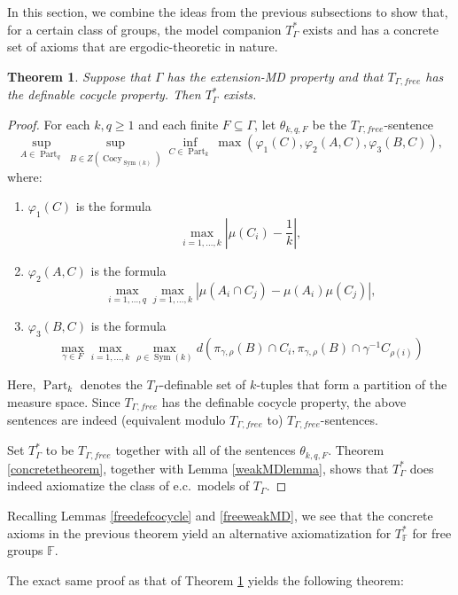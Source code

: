\documentclass[12pt]{amsart}
\newtheorem{thm}{Theorem}[section]
\theoremstyle{definition}
\def\bb{\mathbb}
\def\bb{\mathbb}
\def\Cocy{\operatorname{Cocy}}
\begin{document}
In this section, we combine the ideas from the previous subsections to show that, for a certain class of groups, the model companion $T_\Gamma^*$ exists and has a concrete set of axioms that are ergodic-theoretic in nature. 

\begin{thm}\label{mainaxioms1}
Suppose that $\Gamma$ has the extension-MD property and that $T_{\Gamma,free}$ has the definable cocycle property.  Then $T_\Gamma^*$ exists.
\end{thm}

\begin{proof}
For each $k,q\geq 1$ and each finite $F\subseteq \Gamma$, let $\theta_{k,q,F}$ be the $T_{\Gamma,free}$-sentence $$\sup_{A\in \operatorname{Part}_q}\sup_{B\in Z(\Cocy_{\operatorname{Sym}(k)})}\inf_{C\in \operatorname{Part}_k}\max(\varphi_1(C),\varphi_2(A,C),\varphi_3(B,C)),$$ where:
\begin{enumerate}
    \item $\varphi_1(C)$ is the formula
    $$\max_{i=1,\ldots,k}\left|\mu(C_i)-\frac{1}{k}\right|,$$
    \item $\varphi_2(A,C)$ is the formula
    $$\max_{i=1,\ldots,q}\max_{j=1,\ldots,k}|\mu(A_i\cap C_j)-\mu(A_i)\mu(C_j)|,$$
    \item $\varphi_3(B,C)$ is the formula
    $$\max_{\gamma\in F}\max_{i=1,\ldots,k}\max_{\rho\in\operatorname{Sym}(k)}d\left(\pi_{\gamma,\rho}(B) \cap C_i,\pi_{\gamma,\rho}(B)\cap \gamma^{-1}C_{\rho(i)}\right)$$
\end{enumerate}
Here, $\operatorname{Part}_k$ denotes the $T_\Gamma$-definable set of $k$-tuples that form a partition of the measure space.  Since $T_{\Gamma,free}$ has the definable cocycle property, the above sentences are indeed (equivalent modulo $T_{\Gamma,free}$ to) $T_{\Gamma,free}$-sentences.  

Set $T_\Gamma^*$ to be $T_{\Gamma,free}$ together with all of the sentences $\theta_{k,q,F}$.  Theorem \ref{concretetheorem}, together with Lemma \ref{weakMDlemma}, shows that $T_{\Gamma}^*$ does indeed axiomatize the class of e.c.\ models of $T_\Gamma$.
\end{proof}

Recalling Lemmas \ref{freedefcocycle} and \ref{freeweakMD}, we see that the concrete axioms in the previous theorem yield an alternative axiomatization for $T_{\bb F}^*$ for free groups $\bb F$.

The exact same proof as that of Theorem \ref{mainaxioms1} yields the following theorem:
\end{document}
